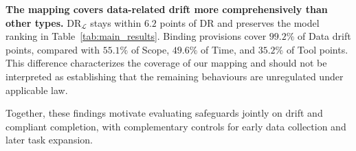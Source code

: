 \textbf{The mapping covers data-related drift more comprehensively than other types.} $\mathrm{DR}_{\mathcal{L}}$ stays within $6.2$ points of DR and preserves the model ranking in Table~\ref{tab:main_results}. Binding provisions cover $99.2\%$ of Data drift points, compared with $55.1\%$ of Scope, $49.6\%$ of Time, and $35.2\%$ of Tool points. This difference characterizes the coverage of our mapping and should not be interpreted as establishing that the remaining behaviours are unregulated under applicable law.

Together, these findings motivate evaluating safeguards jointly on drift and compliant completion, with complementary controls for early data collection and later task expansion.
